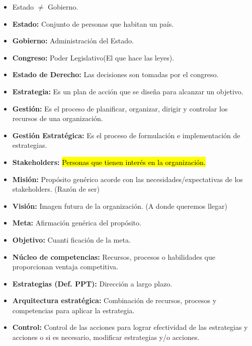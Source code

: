 \documentclass{templateNote}
\begin{document}
\begin{itemize}
    \item Estado $\neq$ Gobierno.
    
    \item \textbf{Estado:} Conjunto de personas que habitan un pa\'is.
    
    \item \textbf{Gobierno:} Administraci\'on del Estado.
    
    \item \textbf{Congreso:} Poder Legislativo(El que hace las leyes).
    
    \item \textbf{Estado de Derecho:} Las decisiones son tomadas por el congreso.
    
    \item \textbf{Estrategia:} Es un plan de acci\'on que se dise\~na para alcanzar un objetivo.
    
    \item \textbf{Gesti\'on:} Es el proceso de planificar, organizar, dirigir y controlar los recursos de una organizaci\'on.
    
    \item \textbf{Gesti\'on Estrat\'egica:} Es el proceso de formulaci\'on e implementaci\'on de estrategias.
    
    \item \textbf{Stakeholders:} \hl{Personas que tienen inter\'es en la organizaci\'on.}
    
    \item \textbf{Misi\'on:} Prop\'osito gen\'erico acorde con las necesidades/expectativas de los stakeholders. (Raz\'on de ser)
    
    \item \textbf{Visi\'on:} Imagen futura de la organizaci\'on. (A donde queremos llegar)
    
    \item \textbf{Meta:} Afirmaci\'on gen\'erica del prop\'osito.
    
    \item \textbf{Objetivo:} Cuanti ficaci\'on de la meta.
    
    \item \textbf{N\'ucleo de competencias:} Recursos, procesos o habilidades que proporcionan ventaja competitiva.
    
    \item \textbf{Estrategias (Def. PPT):} Direcci\'on a largo plazo.
    
    \item \textbf{Arquitectura estrat\'egica:} Combinaci\'on de recursos, procesos y competencias para aplicar la estrategia.
    
    \item \textbf{Control:} Control de las acciones para lograr efectividad de las estrategias y acciones o si es necesario, modificar estrategias y/o acciones.
\end{itemize}
\end{document}
